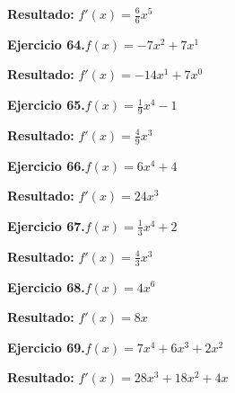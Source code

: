 \documentclass[10pt,a4paper]{article}
\begin{document}
\begin{solbox}
\textbf{Resultado:} \(\displaystyle f'(x) = \frac{6}{6}x^{5}\)
\end{solbox}

\newpage
\begin{ejbox}
\textbf{Ejercicio 64.}\quad $f(x) = -7x^{2} + 7x^{1}$
\end{ejbox}

\begin{solbox}
\textbf{Resultado:} \(\displaystyle f'(x) = -14x^{1} + 7x^{0}\)
\end{solbox}

\begin{ejbox}
\textbf{Ejercicio 65.}\quad $f(x) = \frac{1}{9}x^{4} -1$
\end{ejbox}

\begin{solbox}
\textbf{Resultado:} \(\displaystyle f'(x) = \frac{4}{9}x^{3}\)
\end{solbox}

\begin{ejbox}
\textbf{Ejercicio 66.}\quad $f(x) = 6x^{4} +4$
\end{ejbox}

\begin{solbox}
\textbf{Resultado:} \(\displaystyle f'(x) = 24x^{3}\)
\end{solbox}

\newpage
\begin{ejbox}
\textbf{Ejercicio 67.}\quad $f(x) = \frac{1}{3}x^{4} +2$
\end{ejbox}

\begin{solbox}
\textbf{Resultado:} \(\displaystyle f'(x) = \frac{4}{3}x^{3}\)
\end{solbox}

\begin{ejbox}
\textbf{Ejercicio 68.}\quad $f(x) = 4x^{6}$
\end{ejbox}

\begin{solbox}
\textbf{Resultado:} \(\displaystyle f'(x) = 8x\)
\end{solbox}

\begin{ejbox}
\textbf{Ejercicio 69.}\quad $f(x) = 7x^4 +6x^3 +2x^2$
\end{ejbox}

\begin{solbox}
\textbf{Resultado:} \(\displaystyle f'(x) = 28x^3 +18x^2 +4x\)
\end{solbox}
\end{document}
